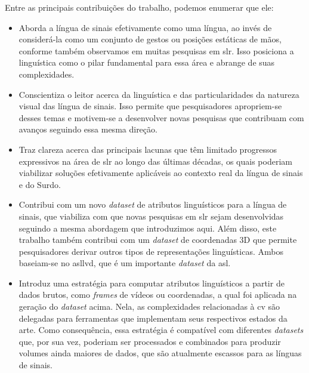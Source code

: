 
Entre as principais contribuições do trabalho, podemos enumerar que ele:

\begin{itemize}
    \item Aborda a língua de sinais efetivamente como uma língua, ao invés de considerá-la como um conjunto de gestos ou posições estáticas de mãos, conforme também observamos em muitas pesquisas em \acrshort{slr}.
          Isso posiciona a linguística como o pilar fundamental para essa área e abrange de suas complexidades.

    \item Conscientiza o leitor acerca da linguística e das particularidades da natureza visual das língua de sinais.
          Isso permite que pesquisadores apropriem-se desses temas e motivem-se a desenvolver novas pesquisas que contribuam com avanços seguindo essa mesma direção.

    \item Traz clareza acerca das principais lacunas que têm limitado progressos expressivos na área de \acrshort{slr} ao longo das últimas décadas, os quais poderiam viabilizar soluções efetivamente aplicáveis ao contexto real da língua de sinais e do Surdo. %

    \item Contribui com um novo \textit{dataset} de atributos linguísticos para a língua de sinais, que viabiliza com que novas pesquisas em \acrshort{slr} sejam desenvolvidas seguindo a mesma abordagem que introduzimos aqui.
          Além disso, este trabalho também contribui com um \textit{dataset} de coordenadas 3D que permite pesquisadores derivar outros tipos de representações linguísticas.
          Ambos baseiam-se no \acrshort{asllvd}, que é um importante \textit{dataset} da \acrshort{asl}.

    \item Introduz uma estratégia para computar atributos linguísticos a partir de dados brutos, como \textit{frames} de vídeos ou coordenadas, a qual foi aplicada na geração do \textit{dataset} acima.
          Nela, as complexidades relacionadas à \acrlong{cv} são delegadas para ferramentas que implementam seus respectivos estados da arte.
          Como consequência, essa estratégia é compatível com diferentes \textit{datasets} que, por sua vez, poderiam ser processados e combinados para produzir volumes ainda maiores de dados, que são atualmente escassos para as línguas de sinais.

\end{itemize}

